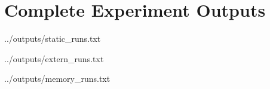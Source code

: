 \documentclass[12pt,a4paper]{article}
\begin{document}
\appendix
\section{Complete Experiment Outputs}\label{app:outputs}


{../outputs/static_runs.txt}


{../outputs/extern_runs.txt}


{../outputs/memory_runs.txt}
\end{document}
